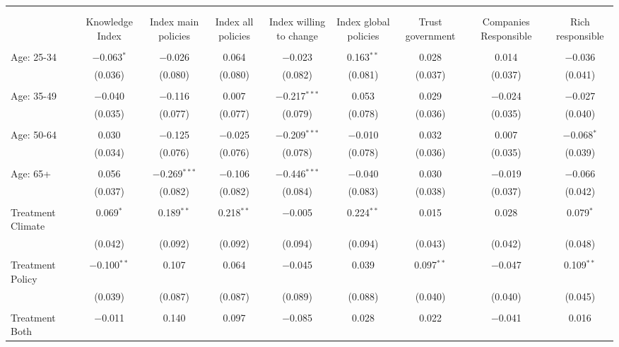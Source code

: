 
\begin{tabular}{@{\extracolsep{5pt}}lcccccccc} 
\\[-1.8ex]\hline 
\hline \\[-1.8ex] 
\\[-1.8ex] & Knowledge Index & Index main policies & Index all policies & Index willing to change & Index global policies & Trust government & Companies Responsible & Rich responsible \\ 
\hline \\[-1.8ex] 
 Age: 25-34 & $-$0.063$^{*}$ & $-$0.026 & 0.064 & $-$0.023 & 0.163$^{**}$ & 0.028 & 0.014 & $-$0.036 \\ 
  & (0.036) & (0.080) & (0.080) & (0.082) & (0.081) & (0.037) & (0.037) & (0.041) \\ 
  & & & & & & & & \\ 
 Age: 35-49 & $-$0.040 & $-$0.116 & 0.007 & $-$0.217$^{***}$ & 0.053 & 0.029 & $-$0.024 & $-$0.027 \\ 
  & (0.035) & (0.077) & (0.077) & (0.079) & (0.078) & (0.036) & (0.035) & (0.040) \\ 
  & & & & & & & & \\ 
 Age: 50-64 & 0.030 & $-$0.125 & $-$0.025 & $-$0.209$^{***}$ & $-$0.010 & 0.032 & 0.007 & $-$0.068$^{*}$ \\ 
  & (0.034) & (0.076) & (0.076) & (0.078) & (0.078) & (0.036) & (0.035) & (0.039) \\ 
  & & & & & & & & \\ 
 Age: 65+ & 0.056 & $-$0.269$^{***}$ & $-$0.106 & $-$0.446$^{***}$ & $-$0.040 & 0.030 & $-$0.019 & $-$0.066 \\ 
  & (0.037) & (0.082) & (0.082) & (0.084) & (0.083) & (0.038) & (0.037) & (0.042) \\ 
  & & & & & & & & \\ 
 Treatment Climate & 0.069$^{*}$ & 0.189$^{**}$ & 0.218$^{**}$ & $-$0.005 & 0.224$^{**}$ & 0.015 & 0.028 & 0.079$^{*}$ \\ 
  & (0.042) & (0.092) & (0.092) & (0.094) & (0.094) & (0.043) & (0.042) & (0.048) \\ 
  & & & & & & & & \\ 
 Treatment Policy & $-$0.100$^{**}$ & 0.107 & 0.064 & $-$0.045 & 0.039 & 0.097$^{**}$ & $-$0.047 & 0.109$^{**}$ \\ 
  & (0.039) & (0.087) & (0.087) & (0.089) & (0.088) & (0.040) & (0.040) & (0.045) \\ 
  & & & & & & & & \\ 
 Treatment Both & $-$0.011 & 0.140 & 0.097 & $-$0.085 & 0.028 & 0.022 & $-$0.041 & 0.016 \\ 

\end{tabular}
